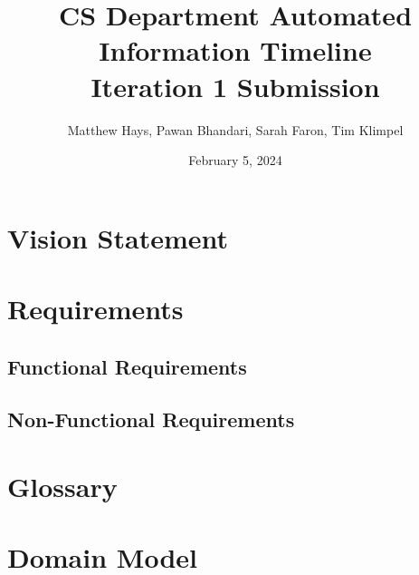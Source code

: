 \documentclass{article}
\title{CS Department Automated Information Timeline \\ Iteration 1 Submission}
\date{February 5, 2024}
\author{Matthew Hays, Pawan Bhandari, Sarah Faron, Tim Klimpel}
\begin{document}
\maketitle
\newpage
\tableofcontents
\listoffigures
\newpage

\section{Vision Statement}

\section{Requirements}
\subsection{Functional Requirements}
\subsection{Non-Functional Requirements}

\section{Glossary}

\section{Domain Model}

\end{document}
